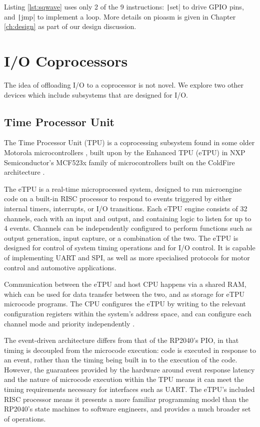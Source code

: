 Listing \ref{lst:sqwave} uses only 2 of the 9 instructions: \texttt|set| to drive GPIO pins, and \texttt|jmp| to implement a loop. More details on pioasm is given in Chapter \ref{ch:design} as part of our design discussion.

\section{I/O Coprocessors}
The idea of offloading I/O to a coprocessor is not novel. We explore two other devices which include subsystems that are designed for I/O.
\subsection{Time Processor Unit}

The Time Processor Unit (TPU) is a coprocessing subsystem found in some older Motorola microcontrollers \cite{tpu}, built upon by the Enhanced TPU (eTPU) in NXP Semiconductor's MCF523x family of microcontrollers built on the ColdFire architecture \cite{mfcdatasheet}.

The eTPU is a real-time microprocessed system, designed to run microengine code on a built-in RISC processor to respond to events triggered by either internal timers, interrupts, or I/O transitions. Each eTPU engine consists of 32 channels, each with an input and output, and containing logic to listen for up to 4 events. Channels can be independently configured to perform functions such as output generation, input capture, or a combination of the two. The eTPU is designed for control of system timing operations and for I/O control. It is capable of implementing UART and SPI, as well as more specialised protocols for motor control and automotive applications.

Communication between the eTPU and host CPU happens via a shared RAM, which can be used for data transfer between the two, and as storage for eTPU microcode programs. The CPU configures the eTPU by writing to the relevant configuration registers within the system's address space, and can configure each channel mode and priority independently \cite{etpu}.

The event-driven architecture differs from that of the RP2040's PIO, in that timing is decoupled from the microcode execution: code is executed in response to an event, rather than the timing being built in to the execution of the code. However, the guarantees provided by the hardware around event response latency and the nature of microcode execution within the TPU means it can meet the timing requirements necessary for interfaces such as UART. The eTPU's included RISC processor means it presents a more familiar programming model than the RP2040's state machines to software engineers, and provides a much broader set of operations.

